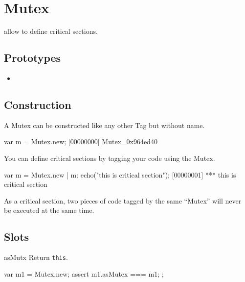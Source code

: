 
\section{Mutex}

 allow to define critical sections.

\subsection{Prototypes}
\begin{itemize}
\item {}
\end{itemize}

\subsection{Construction}
A Mutex can be constructed like any other Tag but without name.

\begin{urbiscript}[firstnumber=1]
var m = Mutex.new;
[00000000] Mutex_0x964ed40
\end{urbiscript}

You can define critical sections by tagging your code using the Mutex.

\begin{urbiscript}[firstnumber=1]
var m = Mutex.new |
m: echo("this is critical section");
[00000001] *** this is critical section
\end{urbiscript}

As a critical section, two pieces of code tagged by the same ``Mutex''
will never be executed at the same time.

\subsection{Slots}

\begin{urbiscriptapi}
\item[asMutx]  Return \lstinline|this|.
\begin{urbiscript}
var m1 = Mutex.new;
assert
{
  m1.asMutex === m1;
};
\end{urbiscript}
\end{urbiscriptapi}


